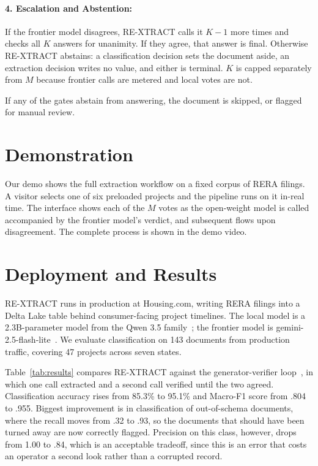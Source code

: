 \documentclass[letterpaper]{article} %
\newcommand{\sys}{RE-XTRACT}
\begin{document}
\paragraph{4. Escalation and Abstention:}
If the frontier model disagrees, \sys{} calls it $K{-}1$ more times and
checks all $K$ answers for unanimity. If they agree, that answer is
final. Otherwise \sys{} abstains: a classification decision sets the document aside,
an extraction decision writes no value, and either is terminal. $K$ is capped
separately from $M$ because frontier calls are metered and local votes are
not.

If any of the gates abstain from answering, the document is skipped, or flagged
for manual review.

\section{Demonstration}

Our demo shows the full extraction workflow on a fixed corpus of RERA
filings. A visitor selects one of six preloaded projects and the pipeline
runs on it in-real time. The interface shows each of the $M$ votes as the open-weight 
model is called accompanied by the frontier model's verdict, and subsequent flows upon disagreement.
The complete process is shown in the demo video.

\section{Deployment and Results}

\sys{} runs in production at Housing.com, writing RERA filings into a Delta
Lake table behind consumer-facing project timelines. The local
model is a 2.3B-parameter model from the Qwen 3.5
family~\citep{bai2023qwenvl}; the frontier model is
gemini-2.5-flash-lite~\citep{comanici2025gemini25}. We evaluate classification on 143
documents from production traffic, covering 47 projects across seven
states.

Table~\ref{tab:results} compares \sys{} against the generator-verifier
loop~\citep{madaan2023selfrefine}, in which one call
extracted and a second call verified until the two agreed. Classification accuracy rises
from 85.3\% to 95.1\% and Macro-F1 score from .804 to .955. Biggest improvement is in classification 
of out-of-schema documents, where the recall moves from .32 to .93, so the documents
that should have been turned away are now correctly flagged. Precision on
this class, however, drops from 1.00 to .84, which is an acceptable tradeoff, since this is an 
error that costs an operator a second look rather than a corrupted record.
\end{document}
